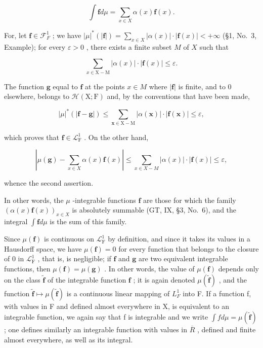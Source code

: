 \[
\int \mathbf {f} d \mu = \sum_ {x \in X} \alpha (x) \mathbf {f} (x).
\]

For, let \(\mathbf{f} \in \mathcal{F}_F^1\) ; we have \(|\mu|^*(|\mathbf{f}|) = \sum_{x \in X} |\alpha(x)| \cdot |\mathbf{f}(x)| < +\infty\) (§1, No.~3, Example); for every \(\varepsilon > 0\) , there exists a finite subset \(M\) of \(X\) such that

\[
\sum_ {x \in \mathrm{X} - \mathrm{M}} | \alpha (x) | \cdot | \mathbf {f} (x) | \leqslant \varepsilon .
\]

The function \(\mathbf{g}\) equal to \(\mathbf{f}\) at the points \(x\in M\) where \(|\mathbf{f}|\) is finite, and to 0 elsewhere, belongs to \(\mathcal{H}(\mathrm{X};\mathrm{F})\) and, by the conventions that have been made,

\[
| \mu | ^ {*} (| \mathbf {f} - \mathbf {g} |) \leqslant \sum_ {\boldsymbol {x} \in \mathrm{X} - \mathrm{M}} | \alpha (\boldsymbol {x}) | \cdot | \mathbf {f} (\boldsymbol {x}) | \leqslant \varepsilon ,
\]

which proves that \(\mathbf{f} \in \mathcal{L}_{\mathrm{F}}^{1}\) . On the other hand,

\[
\left| \mu (\mathbf {g}) - \sum_ {x \in X} \alpha (x) \mathbf {f} (x) \right| \leqslant \sum_ {x \in X - M} | \alpha (x) | \cdot | \mathbf {f} (x) | \leqslant \varepsilon ,
\]

whence the second assertion.

In other words, the \(\mu\) -integrable functions \(\mathbf{f}\) are those for which the family \((\alpha(x)\mathbf{f}(x))_{x\in X}\) is absolutely summable (GT, IX, §3, No.~6), and the integral \(\int \mathbf{f} d\mu\) is the sum of this family.

Since \(\mu(\mathbf{f})\) is continuous on \(\mathcal{L}_{\mathrm{F}}^{1}\) by definition, and since it takes its values in a Hausdorff space, we have \(\mu(\mathbf{f}) = 0\) for every function that belongs to the closure of 0 in \(\mathcal{L}_{\mathrm{F}}^{1}\) , that is, is negligible; if \(\mathbf{f}\) and \(\mathbf{g}\) are two equivalent integrable functions, then \(\mu(\mathbf{f}) = \mu(\mathbf{g})\) . In other words, the value of \(\mu(\mathbf{f})\) depends only on the class \(\widetilde{\mathbf{f}}\) of the integrable function \(\mathbf{f}\) ; it is again denoted \(\mu(\widetilde{\mathbf{f}})\) , and the function \(\widetilde{\mathbf{f}} \mapsto \mu(\widetilde{\mathbf{f}})\) is a continuous linear mapping of \(L_{F}^{1}\) into F. If a function f, with values in F and defined almost everywhere in X, is equivalent to an integrable function, we again say that f is integrable and we write \(\int f d\mu = \mu(\widetilde{\mathbf{f}})\) ; one defines similarly an integrable function with values in \(\overline{R}\) , defined and finite almost everywhere, as well as its integral.

